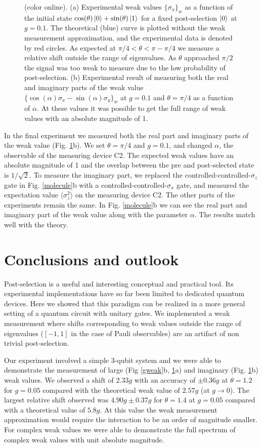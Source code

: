 \documentclass[aps,pra,12pt,onecolumn,showpacs,superscriptaddress,floatfix,footinbib,subfigure]{revtex4}
\def\ket#1{\mathinner{|{#1}\rangle}}
\begin{document}
\begin{figure}[h]
\caption{(color online). (a) Experimental weak values $\{\sigma_x\}_w$ as a function of the initial state $\cos(\theta)\ket{0}+\sin(\theta)\ket{1}$  for a fixed post-selection $\ket{0}$  at $g=0.1$. The theoretical  (blue) curve is plotted without the weak measurement approximation, and the experimental data is denoted by red circles. As expected at  $\pi/4<\theta<\pi-\pi/4$ we measure a relative shift outside the range of eigenvalues. As $\theta$ approached $\pi/2$ the signal was too weak to measure due to the low probability of post-selection.  (b) Experimental result of measuring both the real and imaginary parts of the weak value $\{\cos(\alpha)\sigma_x-\sin(\alpha)\sigma_y\}_w$ at $g=0.1$ and $\theta = \pi/4$ as a function of $\alpha$.  At these values it was possible to get the full range of weak values with an absolute magnitude of 1.}\label{thetaweak}
\end{figure}

In the final experiment we  measured both the real part and imaginary parts of the weak value (Fig. \ref{thetaweak}b).  We set $\theta = \pi/4$ and $g=0.1$, and changed $\alpha$, the observable of the measuring device C2. The expected weak values have an absolute magnitude of 1 and the  overlap between the pre and post-selected state is $1/\sqrt{2}$.  To measure the imaginary part, we replaced the controlled-controlled-$\sigma_z$ gate in Fig. \ref{molecule}b with a controlled-controlled-$\sigma_x$ gate, and measured the expectation value $\langle\sigma_z^2\rangle$ on the measuring device C2. The other parts of the experiments remain the same. In  Fig. \ref{molecule}b we can see the real part and imaginary part of the weak value along with the parameter $\alpha$. The results match well with the theory.


\section{Conclusions and outlook}
Post-selection is a useful and interesting conceptual and practical tool. Its experimental implementations have so far  been limited to dedicated quantum devices. Here we showed that this paradigm can be realized in a more general setting of a quantum circuit with unitary gates. We  implemented a weak measurement where shifts corresponding to weak values outside the range of eigenvalues ($[-1,1]$  in the case of Pauli observables) are an artifact of non trivial post-selection.

Our experiment involved a simple 3-qubit system and we were able to demonstrate the measurement of large (Fig  \ref{gweak}b, \ref{thetaweak}a) and imaginary (Fig. \ref{thetaweak}b) weak values.  We observed  a shift of $2.33g$ with an accuracy of $\pm0.36g$  at $\theta=1.2$ for $g=0.05$    compared with the theoretical weak value of  $2.57g$ (at $g\rightarrow 0$). The largest relative shift observed was  $4.90g\pm  0.37g$ for  $\theta=1.4$  at   $g=0.05$ compared with a theoretical value of  $5.8g$. At this value the  weak measurement approximation would require the interaction to be an order of magnitude smaller.   For complex weak values we were able to demonstrate  the full spectrum of complex weak values with unit  absolute magnitude.
\end{document}
